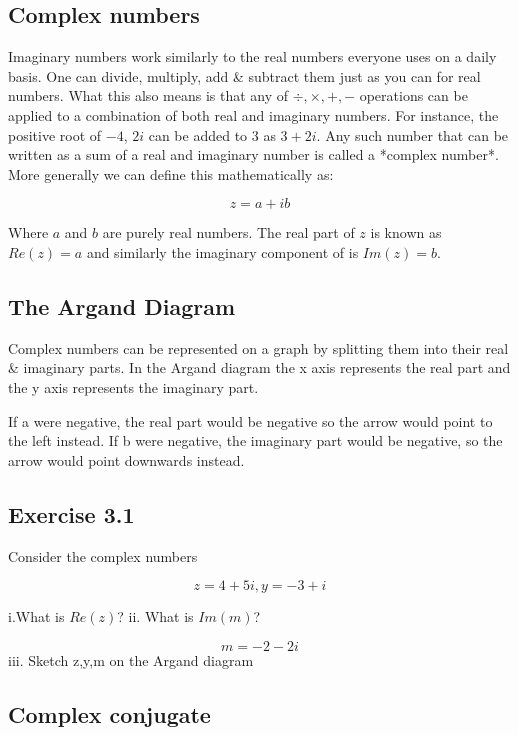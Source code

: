 \documentclass{book}
\begin{document}
\subsection{ Complex numbers}

Imaginary numbers work similarly to the real numbers everyone uses on a  daily basis. One can divide, multiply, add \& subtract them just as you can for real numbers. What this also means is that any of $ \div ,\times, +, - $ operations can be applied to a combination of both real and imaginary numbers. For instance, the positive root of $-4$, $2i$ can be added to $3$ as $3 + 2i $. Any such number that can be written as a sum of a real and imaginary number is called a *complex number*. More generally we can define this mathematically as:

$$ z = a + ib $$

Where $a$ and $b$ are purely real numbers. The real part of $z$ is known as $ Re(z) = a$ and similarly the imaginary component of is $ Im(z) = b$. 

\subsection{ The Argand Diagram}

Complex numbers can be represented on a graph by splitting them into their real \& imaginary parts. In the Argand diagram the x axis represents the real part and the y axis represents the imaginary part. 



If a were negative, the real part would be negative so the arrow would point to the left instead. If b were negative, the imaginary part would be negative, so the arrow would point downwards instead. 

\hline
\subsection{Exercise 3.1}

Consider the complex numbers 

$$ z = 4 + 5i , y = -3 + i $$

i.What is $Re(z)$? 
ii. What is $Im(m)$? 


$$m = -2 - 2i $$ 
iii. Sketch z,y,m on the Argand diagram 

\hline

\subsection{ Complex conjugate}
\end{document}
